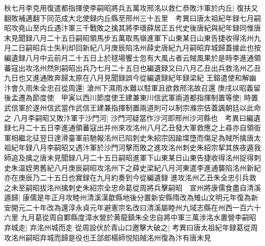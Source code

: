 秋七月李克用復遣都指揮使李嗣昭將兵五萬攻邢洺以救仁恭敗汴軍於内丘|{
	復扶又翻敗補邁翻下同范成大北使録内丘縣至邢州三十五里　考異曰唐太祖紀年録七月嗣昭攻堯山至内丘遇汴軍三千戰敗之擒其將李瓌薛居正五代史後唐紀與紀年録同惟唐末見聞録八月二十五日嗣昭領馬步五萬取馬嶺進軍下山東某日山東告捷收得洺州九月二日嗣昭兵士失利却回新紀八月庚辰陷洺州薛史唐紀九月嗣昭弃城歸蓋據此也按編遺録八月中云前月二十五日上於毬場饗士忽有大風占者云賊風果於是時李進通領蕃寇出攻洺州然則嗣昭出兵乃七月二十五日也編遺録又曰八月乙丑出兵救洺州乙丑九日也又進通敗奔歸太原在八月見聞録誤今從編遺録紀年録梁紀}
王鎔遣使和解幽汴會久雨朱全忠召從周還|{
	滄州下濕雨水難以駐軍且欲救邢洺故召還}
庚戌以昭義留後孟遷為節度使　甲寅以西川節度使王建兼東川信武軍兩道都指揮制置等使|{
	時置武信軍於遂州信武當作武信王建兼指揮制置兩道則可以制宗滌宗佶蓋諷朝廷以此命之}
八月李嗣昭又敗汴軍于沙門河|{
	沙門河疑當作沙河即邢州沙河縣也　考異曰編遺録七月二十五日李進通領蕃寇出并州來攻洺州八月乙丑發大軍救應之上尋亦自領衙軍相繼北征翌日達滑臺軍前馳報洺州已陷刺史朱紹宗因踰堞墮而傷足為賊所擒唐太祖紀年録八月李嗣昭又遇汴軍於沙門河擊而敗之進攻洺州刺史朱紹宗挈其族夜遁我師追及擒之唐末見聞録八月二十五日嗣昭進軍下山東某日山東告捷收得洺州捉得刺史朱温姪男舊紀八月庚辰嗣昭攻洺州下之薛史梁紀八月河東遣李進通襲陷洺州新紀亦在庚辰乃二十五日也實録在九月約奏到今從編遺録}
進攻洺州乙丑朱全忠引兵救之未至嗣昭拔洺州擒刺史朱紹宗全忠命葛從周將兵擊嗣昭　宣州將康儒食盡自清溪遁歸|{
	康儒是年正月攻睦州清溪漢歙縣地後分置新安縣隋改為雉山文明元年復為新安開元二十年改為還淳永貞元年避憲宗名改曰清溪屬睦州九域志縣在州西一百六十六里}
九月葛從周自鄴縣度漳水營於黄龍鎮朱全忠自將中軍三萬涉洺水置營李嗣昭弃城走|{
	弃洺州城而走}
從周設伏於青山口邀擊大破之|{
	考異曰唐太祖紀年録葛從周攻洺州嗣昭弃城而歸是役也王郃郎楊師悦陷賊洺州復為汴有唐末見}


